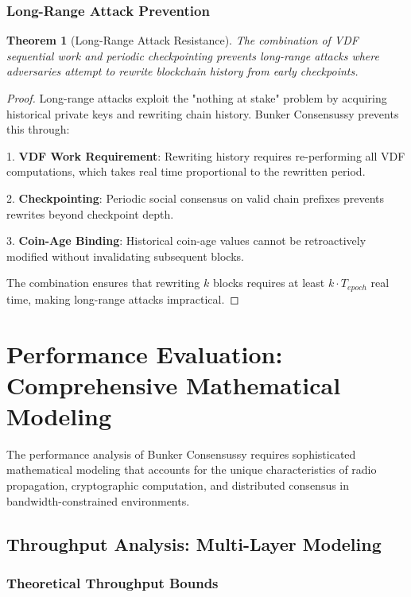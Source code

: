 \documentclass[11pt,a4paper]{article}
\newtheorem{theorem}{Theorem}[section]
\begin{document}
\subsubsection{Long-Range Attack Prevention}

\begin{theorem}[Long-Range Attack Resistance]
The combination of VDF sequential work and periodic checkpointing prevents long-range attacks where adversaries attempt to rewrite blockchain history from early checkpoints.
\end{theorem}

\begin{proof}
Long-range attacks exploit the "nothing at stake" problem by acquiring historical private keys and rewriting chain history. Bunker Consensussy prevents this through:

1. \textbf{VDF Work Requirement}: Rewriting history requires re-performing all VDF computations, which takes real time proportional to the rewritten period.

2. \textbf{Checkpointing}: Periodic social consensus on valid chain prefixes prevents rewrites beyond checkpoint depth.

3. \textbf{Coin-Age Binding}: Historical coin-age values cannot be retroactively modified without invalidating subsequent blocks.

The combination ensures that rewriting $k$ blocks requires at least $k \cdot T_{epoch}$ real time, making long-range attacks impractical.
\end{proof}

\section{Performance Evaluation: Comprehensive Mathematical Modeling}

The performance analysis of Bunker Consensussy requires sophisticated mathematical modeling that accounts for the unique characteristics of radio propagation, cryptographic computation, and distributed consensus in bandwidth-constrained environments.

\subsection{Throughput Analysis: Multi-Layer Modeling}

\subsubsection{Theoretical Throughput Bounds}
\end{document}
